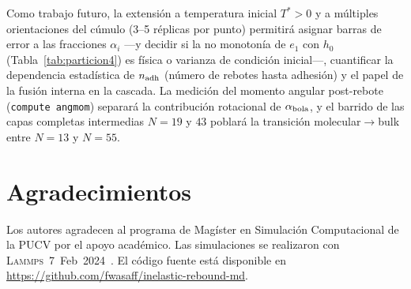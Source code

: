 \documentclass[12pt,a4paper]{article}
\newcommand{\Tstar}{T^*}
\newcommand{\lammps}{\textsc{Lammps}}
\begin{document}
Como trabajo futuro, la extensión a temperatura inicial $\Tstar>0$ y a
múltiples orientaciones del cúmulo (3--5 réplicas por punto) permitirá
asignar barras de error a las fracciones $\alpha_i$ ---y decidir si la no
monotonía de $e_1$ con $h_0$ (Tabla~\ref{tab:particion4}) es física o
varianza de condición inicial---, cuantificar la dependencia estadística de
$n_{\rm adh}$ (número de rebotes hasta adhesión) y el papel de la fusión
interna en la cascada. La medición del momento angular post-rebote
(\texttt{compute angmom}) separará la contribución rotacional de
$\alpha_{\rm bola}$, y el barrido de las capas completas intermedias
$N=19$ y $43$ poblará la transición molecular$\to$bulk entre
$N=13$ y $N=55$.

\section*{Agradecimientos}

Los autores agradecen al programa de Magíster en Simulación Computacional de la
PUCV por el apoyo académico. Las simulaciones se realizaron con
\lammps~7~Feb~2024~\cite{Thompson2022}. El código fuente está disponible en
\url{https://github.com/fwasaff/inelastic-rebound-md}.
\end{document}
